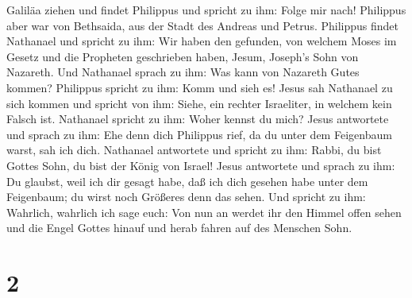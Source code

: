 Galiläa ziehen und findet Philippus und spricht zu ihm: Folge mir nach!
 Philippus aber war von Bethsaida, aus der Stadt des
Andreas und Petrus.  Philippus findet Nathanael und spricht
zu ihm: Wir haben den gefunden, von welchem Moses im Gesetz und die
Propheten geschrieben haben, Jesum, Joseph's Sohn von Nazareth.
 Und Nathanael sprach zu ihm: Was kann von Nazareth Gutes
kommen? Philippus spricht zu ihm: Komm und sieh es!  Jesus
sah Nathanael zu sich kommen und spricht von ihm: Siehe, ein rechter
Israeliter, in welchem kein Falsch ist.  Nathanael spricht
zu ihm: Woher kennst du mich? Jesus antwortete und sprach zu ihm: Ehe
denn dich Philippus rief, da du unter dem Feigenbaum warst, sah ich
dich.  Nathanael antwortete und spricht zu ihm: Rabbi, du
bist Gottes Sohn, du bist der König von Israel!  Jesus
antwortete und sprach zu ihm: Du glaubst, weil ich dir gesagt habe, daß
ich dich gesehen habe unter dem Feigenbaum; du wirst noch Größeres denn
das sehen.  Und spricht zu ihm: Wahrlich, wahrlich ich sage
euch: Von nun an werdet ihr den Himmel offen sehen und die Engel Gottes
hinauf und herab fahren auf des Menschen Sohn.

\hypertarget{section-1}{%
\section{2}\label{section-1}}

